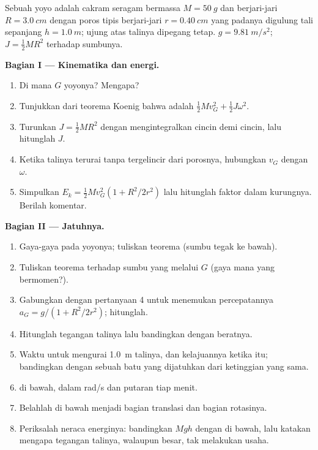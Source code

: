 \begin{problem}
\label{pb:b1:systems-of-points:1}
Sebuah yoyo adalah cakram seragam bermassa $M = \qty{50}{g}$ dan berjari-jari $R =
\qty{3.0}{cm}$ dengan poros tipis berjari-jari $r = \qty{0.40}{cm}$ yang padanya
digulung tali sepanjang $h = \qty{1.0}{m}$; ujung atas talinya
dipegang tetap. $g = \qty{9.81}{m/s^2}$; $J = \tfrac12 MR^2$ terhadap
sumbunya.

\medskip
\noindent\textbf{Bagian I --- Kinematika dan energi.}
\begin{enumerate}
  \item Di mana  $G$ yoyonya? Mengapa?
  \item Tunjukkan dari teorema Koenig bahwa  adalah $\tfrac12
        Mv_G^2 + \tfrac12 J\omega^2$.
  \item Turunkan $J = \tfrac12 MR^2$ dengan mengintegralkan cincin demi cincin, lalu hitunglah
        $J$.
  \item Ketika talinya terurai tanpa tergelincir dari porosnya, hubungkan
        $v_G$ dengan $\omega$.
  \item Simpulkan $E_k = \tfrac12 Mv_G^2(1 + R^2/2r^2)$ lalu hitunglah
        faktor dalam kurungnya. Berilah komentar.
\end{enumerate}

\medskip
\noindent\textbf{Bagian II --- Jatuhnya.}
\begin{enumerate}[resume]
  \item Gaya-gaya pada yoyonya; tuliskan teorema 
        (sumbu tegak ke bawah).
  \item Tuliskan teorema  terhadap sumbu yang melalui $G$
        (gaya mana yang bermomen?).
  \item Gabungkan dengan pertanyaan 4 untuk menemukan percepatannya $a_G = g/(1 +
        R^2/2r^2)$; hitunglah.
  \item Hitunglah tegangan talinya lalu bandingkan dengan beratnya.
  \item Waktu untuk mengurai \qty{1.0}{m} talinya, dan kelajuannya ketika itu;
        bandingkan dengan sebuah batu yang dijatuhkan dari ketinggian yang sama.
  \item {} di bawah, dalam rad/s dan putaran tiap menit.
  \item Belahlah  di bawah menjadi bagian translasi
        dan bagian rotasinya.
  \item Periksalah neraca energinya: bandingkan $Mgh$ dengan 
        di bawah, lalu katakan mengapa tegangan talinya, walaupun besar,
        tak melakukan usaha.
\end{enumerate}


\end{problem}
